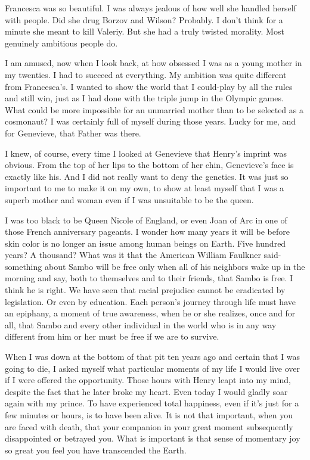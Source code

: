 \documentclass[]{article}
\begin{document}
{Francesca was so beautiful.  I was always jealous of how well she handled herself with people.  Did she drug Borzov and Wilson? Probably.  I don’t think for a minute she meant to kill Valeriy.  But she had a truly twisted morality.  Most genuinely ambitious people do.

I am amused, now when I look back, at how obsessed I was as a young mother in my twenties.  I had to succeed at everything.  My ambition was quite different from Francesca’s.  I wanted to show the world that I could-play by all the rules and still win, just as I had done with the triple jump in the Olympic games.  What could be more impossible for an unmarried mother than to be selected as a cosmonaut? I was certainly full of myself during those years.  Lucky for me, and for Genevieve, that Father was there.

I knew, of course, every time I looked at Genevieve that Henry’s imprint was obvious.  From the top of her lips to the bottom of her chin, Genevieve’s face is exactly like his.  And I did not really want to deny the genetics.  It was just so important to me to make it on my own, to show at least myself that I was a superb mother and woman even if I was unsuitable to be the queen.

I was too black to be Queen Nicole of England, or even Joan of Arc in one of those French anniversary pageants.  I wonder how many years it will be before skin color is no longer an issue among human beings on Earth.  Five hundred years? A thousand? What was it that the American William Faulkner said-something about Sambo will be free only when all of his neighbors wake up in the morning and say, both to themselves and to their friends, that Sambo is free.  I think he is right.  We have seen that racial prejudice cannot be eradicated by legislation.  Or even by education.  Each person’s journey through life must have an epiphany, a moment of true awareness, when he or she realizes, once and for all, that Sambo and every other individual in the world who is in any way different from him or her must be free if we are to survive.

When I was down at the bottom of that pit ten years ago and certain that I was going to die, I asked myself what particular moments of my life I would live over if I were offered the opportunity.  Those hours with Henry leapt into my mind, despite the fact that he later broke my heart.  Even today I would gladly soar again with my prince.  To have experienced total happiness, even if it’s just for a few minutes or hours, is to have been alive.  It is not that important, when you are faced with death, that your companion in your great moment subsequently disappointed or betrayed you.  What is important is that sense of momentary joy so great you feel you have transcended the Earth.

}
\end{document}
